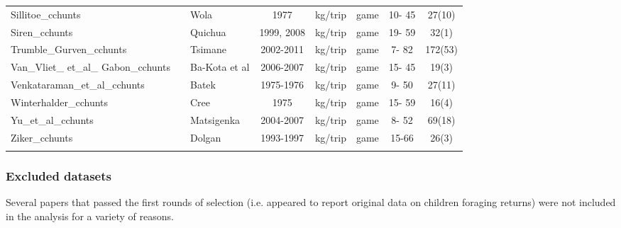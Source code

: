 \begin{landscape}
\begin{longtable}{M{2.6cm} M{3.6cm} M{1.5cm} c c M{1cm} c c}
Sillitoe\_cchunts              & \cite{sillitoe_managing_2004}             & Wola            & 1977       & kg/trip   & game               & 10- 45  & 27(10)    \\
Siren\_cchunts                 & \cite{siren_effects_2016}                 & Quichua         & 1999, 2008 & kg/trip   & game               & 19- 59  & 32(1)      \\
Trumble\_Gurven\_cchunts        & \cite{gurven_how_2006}                    & Tsimane         & 2002-2011  & kg/trip   & game               & 7- 82   & 172(53)    \\
Van\_Vliet\_ et\_al\_ Gabon\_cchunts & \cite{van_vliet_hunting_2008}             & Ba-Kota et al   & 2006-2007  & kg/trip   & game               & 15- 45  & 19(3)      \\
Venkataraman\_et\_al\_cchunts    & \cite{endicott_hunting_1979}              & Batek           & 1975-1976  & kg/trip   & game               & 9- 50   & 27(11)     \\
Winterhalder\_cchunts          & \cite{winterhalder_boreal_1983}           & Cree            & 1975       & kg/trip   & game               & 15- 59  & 16(4)     \\
Yu\_et\_al\_cchunts              & \cite{ohl-schacherer_sustainability_2007} & Matsigenka      & 2004-2007  & kg/trip   & game               & 8- 52   & 69(18)   \\
Ziker\_cchunts                 & \cite{ziker_peoples_2002}                 & Dolgan          & 1993-1997 & kg/trip   & game               & 15-66  & 26(3)     \\ 
\renewcommand{\tablename}{Table S}
\label{tab:metadata}
\end{longtable}
\end{landscape}


\subsubsection{Excluded datasets} \label{SI:excluded}

Several papers that passed the first rounds of selection (i.e. appeared to report original data on children foraging returns) were not included in the analysis for a variety of reasons. 

